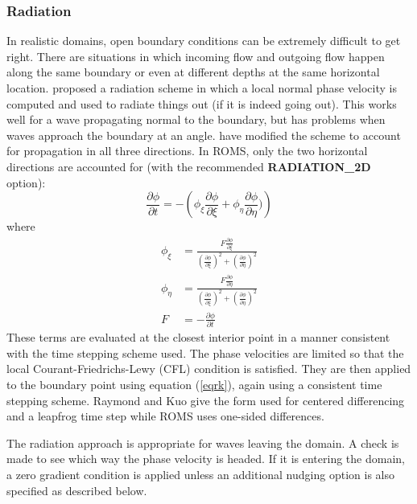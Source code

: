 \documentclass[11pt]{article}
\newcommand{\code}[1]{\mbox{\bf#1}}
\begin{document}
\subsubsection{Radiation}
In realistic domains, open boundary conditions can be extremely
difficult to get right. There are situations in which incoming flow and
outgoing flow happen along the same boundary or even at different
depths at the same horizontal location. \citet{Orlanski76}
proposed a radiation scheme in which a local normal phase velocity is
computed and used to radiate things out (if it is indeed going out).
This works well for a wave propagating normal to the boundary, but
has problems when waves approach the boundary at an angle.
\citet{Raymond84} have modified the scheme to account for
propagation in all three directions. In ROMS, only the two horizontal
directions are accounted for (with the recommended \code{RADIATION\_2D}
option):
\begin{equation}
   \frac{\partial \phi}{\partial t} = - \left( \phi_\xi \frac{\partial
   \phi}{\partial \xi} + \phi_\eta \frac{\partial \phi}{\partial \eta}) \right)
\label{eqrk}
\end{equation}
where
\begin{align}
  \phi_\xi & = \frac{F \frac{\partial \phi}{\partial \xi}}{
  \left( \frac{\partial \phi}{\partial \xi} \right)^2 +
  \left( \frac{\partial \phi}{\partial \eta} \right)^2 } \\ 
  \phi_\eta & = \frac{F \frac{\partial \phi}{\partial \eta}}{
  \left( \frac{\partial \phi}{\partial \xi} \right)^2 +
  \left( \frac{\partial \phi}{\partial \eta} \right)^2 } \\ 
   F & = - \frac{\partial \phi}{\partial t}
\end{align}
These terms are evaluated at the closest interior point in a manner
consistent with the time stepping scheme used. The phase velocities are
limited so that the local Courant-Friedrichs-Lewy (CFL) condition
is satisfied. They are then
applied to the boundary point using equation (\ref{eqrk}), again using
a consistent time stepping scheme. Raymond and Kuo give the form used
for centered differencing and a leapfrog time step while ROMS uses
one-sided differences.

The radiation approach is appropriate for waves leaving the domain. A
check is made to see which way the phase velocity is headed. If it
is entering the domain, a zero gradient condition is applied unless
an additional nudging option is also specified as described below.
\end{document}

